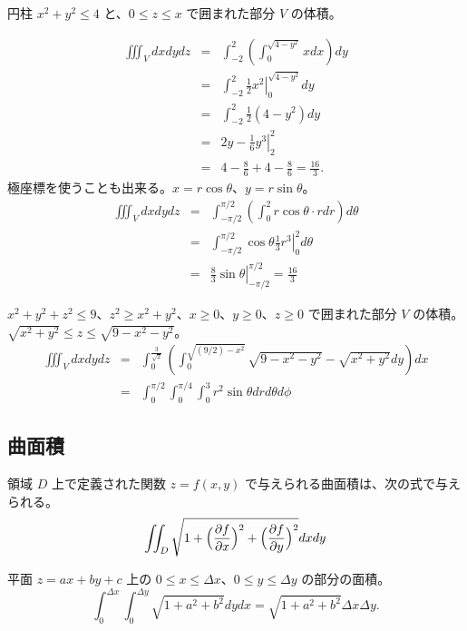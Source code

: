 \begin{eg}
円柱 $x^2+y^2\leq 4$  と、$0\leq z\leq x$ で囲まれた部分 $V$ の体積。

\begin{eqnarray}
\iiint_Vdxdydz & = & \int_{-2}^2\left(\int_0^{\sqrt{4-y^2}}xdx\right)dy\\
& = & \int_{-2}^2\left.\frac12x^2\right|_0^{\sqrt{4-y^2}}dy\\
& = & \int_{-2}^2\frac12(4-y^2)dy\\
& = & \left.2y - \frac16y^3\right|_2^2\\
& = & 4 - \frac86 + 4 - \frac86 = \frac{16}3.
\end{eqnarray}
極座標を使うことも出来る。$x = r\cos\theta$、$y = r\sin\theta$。
\begin{eqnarray}
\iiint_Vdxdydz & = &\int_{-\pi/2}^{\pi/2}\left(
\int_0^2 r\cos\theta\cdot rdr\right)d\theta\\
& = & \int_{-\pi/2}^{\pi/2}\left.\cos\theta\frac13r^3\right|_0^2d\theta\\
& = & \left.\frac83\sin\theta\right|_{-\pi/2}^{\pi/2} = \frac{16}{3}
\end{eqnarray}
\end{eg}

\begin{eg}
$x^2+y^2+z^2\leq 9$、$z^2\geq x^2+y^2$、$x\geq 0$、$y\geq 0$、$z\geq 0$ で囲まれた部分 $V$ の体積。$\sqrt{x^2+y^2}\leq z\leq \sqrt{9-x^2-y^2}$。
\begin{eqnarray}
\iiint_Vdxdydz & = & \int_0^{\frac{3}{\sqrt{2}}}\left(\int_0^{\sqrt{(9/2)-x^2}}\sqrt{9-x^2-y^2} - \sqrt{x^2+y^2}dy\right)dx\\
& = & \int_0^{\pi/2}\int_0^{\pi/4}\int_0^3r^2\sin\theta drd\theta d\phi
\end{eqnarray}
\end{eg}

\subsection{曲面積}
\begin{prop} \label{prop:surface}
領域 $D$ 上で定義された関数 $z=f(x,y)$ で与えられる曲面積は、次の式で与えられる。
$$\iint_D\sqrt{1+\Bigl(\frac{\partial f}{\partial x}\Bigr)^2 + \Bigl(\frac{\partial f}{\partial y}\Bigr)^2}dxdy$$
\end{prop}

\begin{eg}
平面 $z = ax + by + c$ 上の $0\leq x\leq \Delta x$、$0\leq y\leq \Delta y$ の部分の面積。
$$\int_0^{\Delta x}\int_0^{\Delta y}\sqrt{1 + a^2 + b^2}dydx = \sqrt{1+a^2+b^2}\Delta x\Delta y.$$
\end{eg}


